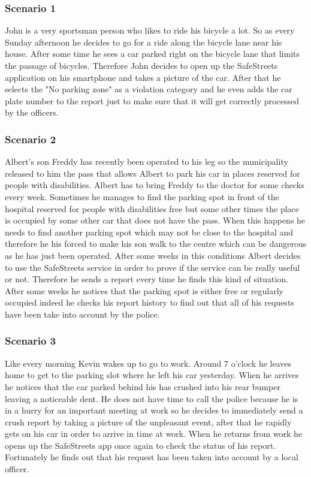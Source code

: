 \subsubsection{Scenario 1}
John is a very sportsman person who likes to ride his bicycle a lot. So as every Sunday afternoon he decides to go for a ride along the bicycle lane near his house. After some time he sees a car parked right on the bicycle lane that limits the passage of bicycles. Therefore John decides to open up the SafeStreets application on his smartphone and takes a picture of the car. After that he selects the "No parking zone" as a violation category and he even adds the car plate number to the report just to make sure that it will get correctly processed by the officers. 

\subsubsection{Scenario 2}
Albert's son Freddy has recently been operated to his leg so the municipality released to him the pass that allows Albert to park his car in places reserved for people with disabilities. Albert has to bring Freddy to the doctor for some checks every week. Sometimes he manages to find the parking spot in front of the hospital reserved for people with disabilities free but some other times the place is occupied by some other car that does not have the pass. When this happens he needs to find another parking spot which may not be close to the hospital and therefore he his forced to make his son walk to the centre which can be dangerous as he has just been operated. After some weeks in this conditions Albert decides to use the SafeStreets service in order to prove if the service can be really useful or not. Therefore he sends a report every time he finds this kind of situation. After some weeks he notices that the parking spot is either free or regularly occupied indeed he checks his report history to find out that all of his requests have been take into account by the police.



\subsubsection{Scenario 3}
Like every morning Kevin wakes up to go to work. Around 7 o'clock he leaves home to get to the parking slot where he left his car yesterday. When he arrives he notices that the car parked behind his has crushed into his rear bumper leaving a noticeable dent. He does not have time to call the police because he is in a hurry for an important meeting at work so he decides to immediately send a crush report by taking a picture of the unpleasant event, after that he rapidly gets on his car in order to arrive in time at work. When he returns from work he opens up the SafeStreets app once again to check the status of his report. Fortunately he finds out that his request has been taken into account by a local officer.


